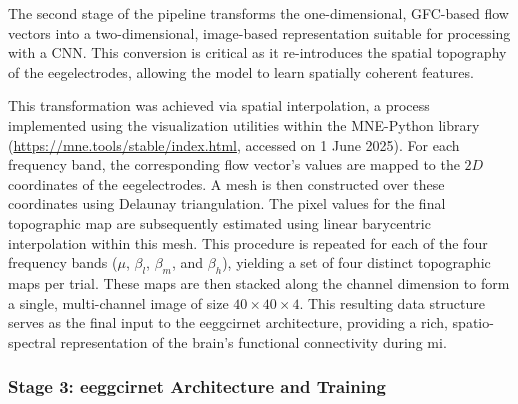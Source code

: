 The second stage of the pipeline transforms the one-dimensional, GFC-based flow vectors into a two-dimensional, image-based representation suitable for processing with a CNN. This conversion is critical as it re-introduces the spatial topography of the \gls{eeg}electrodes, allowing the model to learn spatially coherent features.

This transformation was achieved via spatial interpolation, a process implemented using the visualization utilities within the MNE-Python library
 (\url{https://mne.tools/stable/index.html}, accessed on 1 June 2025). For each frequency band, the corresponding flow vector's values are mapped to the $2D$ coordinates of the \gls{eeg}electrodes. A mesh is then constructed over these coordinates using Delaunay triangulation. The pixel values for the final topographic map are subsequently estimated using linear barycentric interpolation within this mesh. This procedure is repeated for each of the four frequency bands ($\mu$, $\beta_l$, $\beta_m$, and $\beta_h$), yielding a set of four distinct topographic maps per trial. These maps are then stacked along the channel dimension to form a single, multi-channel image of size $40 \times 40 \times 4$. This resulting data structure serves as the final input to the \gls{eeggcirnet} architecture, providing a rich, spatio-spectral representation of the brain's functional connectivity during \gls{mi}.

\subsubsection{Stage 3: \gls{eeggcirnet} Architecture and Training}

